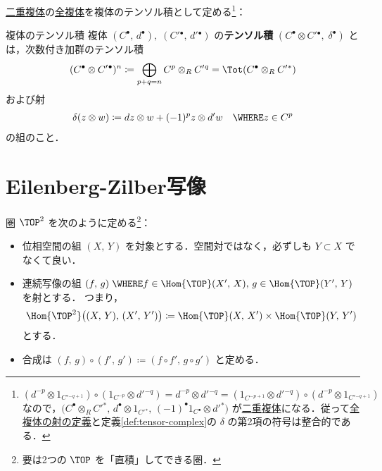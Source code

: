 \documentclass[algtopo_main]{subfiles}
\begin{document}
\hyperref[def:double-complx]{二重複体}の\hyperref[def:Tot]{全複体}を複体のテンソル積として定める\footnote{$(d^{-p} \otimes 1_{C'{}^{-q+1}}) \circ (1_{C^{-p}} \otimes d'{}^{-q}) = d^{-p} \otimes d'{}^{-q} = (1_{C^{-p+1}} \otimes d'{}^{-q}) \circ (d^{-p} \otimes 1_{C'{}^{-q+1}})$ なので，$\bigl( C^\bullet \otimes_R C'{}^*,\, d^\bullet \otimes 1_{C'{}^*},\, (-1)^\bullet 1_{C{}^\bullet} \otimes d'{}^* \bigr)$ が\hyperref[def:double-complex]{二重複体}になる．従って\hyperref[def:Tot]{全複体の射の定義}と定義\ref{def:tensor-complex}の $\delta$ の第2項の符号は整合的である．}：
\begin{mydef}[label=def:tensor-complex]{複体のテンソル積}
    複体 $(C^\bullet,\, d^\bullet),\; (C'{}^\bullet,\, d'{}^\bullet)$ の\textbf{テンソル積} $(C^\bullet \otimes C'{}^\bullet,\; \delta^\bullet)$ とは，次数付き加群のテンソル積
    \begin{align}
        (C^\bullet \otimes C'{}^\bullet)^n \coloneqq \bigoplus_{p+q=n} C^p \otimes_R C'{}^q = \Tot (C^\bullet \otimes_R C'{}^*)
    \end{align}
    および射
    \begin{align}
        \delta (z \otimes w) \coloneqq d z \otimes w + (-1)^p z \otimes d' w \quad \WHERE z \in C^p
    \end{align}
    の組のこと．
\end{mydef}

\section{Eilenberg-Zilber写像}

圏 $\TOP^2$ を次のように定める\footnote{要は2つの $\TOP$ を「直積」してできる圏．}：
\begin{itemize}
    \item 位相空間の組 $(X,\, Y)$ を対象とする．空間対ではなく，必ずしも $Y \subset X$ でなくて良い．
    \item 連続写像の組 $(f,\, g)\; \WHERE f \in \Hom{\TOP} (X',\, X),\, g \in \Hom{\TOP} (Y' ,\, Y)$ を射とする．
    つまり，
    \[\Hom{\TOP^2} \bigl( (X,\, Y),\, (X',\, Y') \bigr) \coloneqq \Hom{\TOP} (X,\, X') \times \Hom{\TOP} (Y,\, Y')\]
    とする．
    \item 合成は $(f,\, g) \circ (f',\, g') \coloneqq (f \circ f',\, g \circ g')$ と定める．
\end{itemize}
\end{document}
